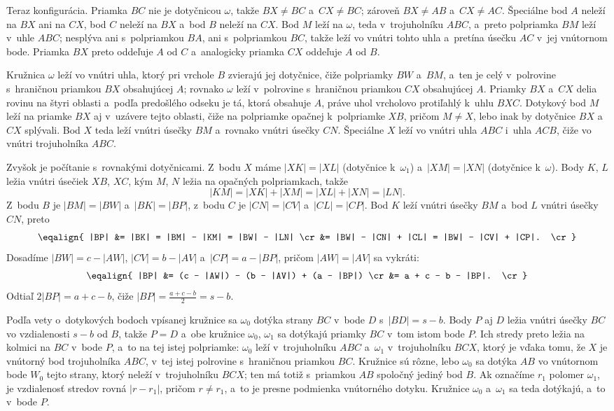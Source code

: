 {    Teraz konfigurácia. Priamka $BC$ nie je dotyčnicou $\omega$, takže $BX \neq BC$ a~$CX \neq BC$; zároveň $BX \neq AB$ a~$CX \neq AC$. Špeciálne bod $A$ neleží na $BX$ ani na $CX$, bod $C$ neleží na $BX$ a~bod $B$ neleží na $CX$. Bod $M$ leží na $\omega$, teda v~trojuholníku $ABC$, a~preto polpriamka $BM$ leží v~uhle $ABC$; nesplýva ani s~polpriamkou $BA$, ani s~polpriamkou $BC$, takže leží vo vnútri tohto uhla a~pretína úsečku $AC$ v~jej vnútornom bode. Priamka $BX$ preto oddeľuje $A$ od $C$ a~analogicky priamka $CX$ oddeľuje $A$ od $B$.

    Kružnica $\omega$ leží vo vnútri uhla, ktorý pri vrchole $B$ zvierajú jej dotyčnice, čiže polpriamky $BW$ a~$BM$, a~ten je celý v~polrovine s~hraničnou priamkou $BX$ obsahujúcej $A$; rovnako $\omega$ leží v~polrovine s~hraničnou priamkou $CX$ obsahujúcej $A$. Priamky $BX$ a~$CX$ delia rovinu na štyri oblasti a~podľa predošlého odseku je tá, ktorá obsahuje $A$, práve uhol vrcholovo protiľahlý k~uhlu $BXC$. Dotykový bod $M$ leží na priamke $BX$ aj v~uzávere tejto oblasti, čiže na polpriamke opačnej k~polpriamke $XB$, pričom $M \neq X$, lebo inak by dotyčnice $BX$ a~$CX$ splývali. Bod $X$ teda leží vnútri úsečky $BM$ a~rovnako vnútri úsečky $CN$. Špeciálne $X$ leží vo vnútri uhla $ABC$ i~uhla $ACB$, čiže vo vnútri trojuholníka $ABC$.

    Zvyšok je počítanie s~rovnakými dotyčnicami. Z~bodu $X$ máme $|XK| = |XL|$ (dotyčnice k~$\omega_1$) a~$|XM| = |XN|$ (dotyčnice k~$\omega$). Body $K$, $L$ ležia vnútri úsečiek $XB$, $XC$, kým $M$, $N$ ležia na opačných polpriamkach, takže
    $$
    |KM| = |XK| + |XM| = |XL| + |XN| = |LN|.
    $$
    Z~bodu $B$ je $|BM| = |BW|$ a~$|BK| = |BP|$, z~bodu $C$ je $|CN| = |CV|$ a~$|CL| = |CP|$. Bod $K$ leží vnútri úsečky $BM$ a~bod $L$ vnútri úsečky $CN$, preto
    $$
    \eqalign{
    |BP| &= |BK| = |BM| - |KM| = |BW| - |LN| \cr
         &= |BW| - |CN| + |CL| = |BW| - |CV| + |CP|. \cr
    }
    $$
    Dosadíme $|BW| = c - |AW|$, $|CV| = b - |AV|$ a~$|CP| = a - |BP|$, pričom $|AW| = |AV|$ sa vykráti:
    $$
    \eqalign{
    |BP| &= (c - |AW|) - (b - |AV|) + (a - |BP|) \cr
         &= a + c - b - |BP|. \cr
    }
    $$
    Odtiaľ $2|BP| = a + c - b$, čiže $|BP| = \frac{a+c-b}{2} = s - b$.

    Podľa vety o~dotykových bodoch vpísanej kružnice sa $\omega_0$ dotýka strany $BC$ v~bode $D$ s~$|BD| = s - b$. Body $P$ aj $D$ ležia vnútri úsečky $BC$ vo vzdialenosti $s - b$ od $B$, takže $P = D$ a~obe kružnice $\omega_0$, $\omega_1$ sa dotýkajú priamky $BC$ v~tom istom bode $P$. Ich stredy preto ležia na kolmici na $BC$ v~bode $P$, a~to na tej istej polpriamke: $\omega_0$ leží v~trojuholníku $ABC$ a~$\omega_1$ v~trojuholníku $BCX$, ktorý je vďaka tomu, že $X$ je vnútorný bod trojuholníka $ABC$, v~tej istej polrovine s~hraničnou priamkou $BC$. Kružnice sú rôzne, lebo $\omega_0$ sa dotýka $AB$ vo vnútornom bode $W_0$ tejto strany, ktorý neleží v~trojuholníku $BCX$; ten má totiž s~priamkou $AB$ spoločný jediný bod $B$. Ak označíme $r_1$ polomer $\omega_1$, je vzdialenosť stredov rovná $|r - r_1|$, pričom $r \neq r_1$, a~to je presne podmienka vnútorného dotyku. Kružnice $\omega_0$ a~$\omega_1$ sa teda dotýkajú, a~to v~bode $P$.
}

